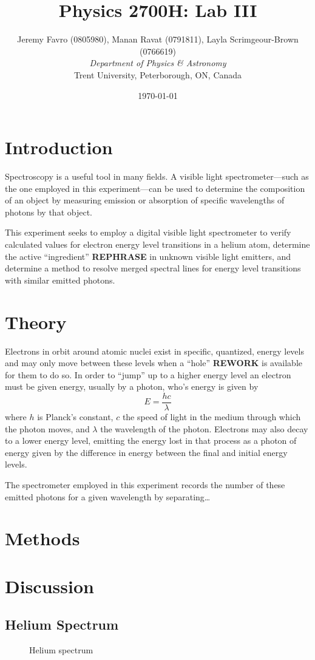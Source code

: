 \documentclass[10pt, twocolumn]{article}
\title{Physics 2700H: Lab III}
\author{Jeremy Favro (0805980),
Manan Ravat (0791811),
Layla Scrimgeour-Brown (0766619)
 \\\emph{Department of Physics \& Astronomy}\\ Trent University, Peterborough, ON, Canada}
\date{\today}
\theoremstyle{definition}
\begin{document}
\maketitle
\begin{abstract}
\end{abstract}
\section{Introduction}
Spectroscopy is a useful tool in many fields. A visible light spectrometer---such as the one employed in this experiment---can be used to determine the composition of an object by measuring emission or absorption of
specific wavelengths of photons by that object.

This experiment seeks to employ a digital visible light spectrometer to verify calculated values for electron energy level transitions in a helium atom,
determine the active ``ingredient'' \textbf{REPHRASE} in unknown visible light emitters, and determine a method to resolve merged spectral lines for energy
level transitions with similar emitted photons.
\section{Theory}
Electrons in orbit around atomic nuclei exist in specific, quantized, energy levels and may only move between these levels when a ``hole'' \textbf{REWORK}
is available for them to do so. In order to ``jump'' up to a higher energy level an electron must be given energy, usually by a photon, who's energy is given by
$$E=\frac{hc}{\lambda}$$ where $h$ is Planck's constant\cite{codata}, $c$ the speed of light in the medium through which the photon moves, and $\lambda$ the
wavelength of the photon. Electrons may also decay to a lower energy level, emitting the energy lost in that process as a photon of energy given by the difference in energy
between the final and initial energy levels.

The spectrometer employed in this experiment records the number of these emitted photons for a given wavelength by separating\dots
\section{Methods}
\lipsum[3-5]
\section{Discussion}
\subsection{Helium Spectrum}
\begin{figure}
  \caption{Helium spectrum}
\end{figure}
\end{document}
